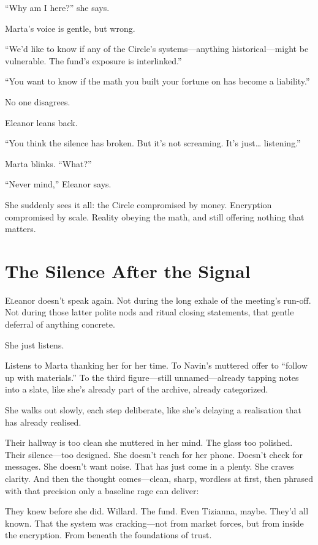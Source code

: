 “Why am I here?” she says.

Marta’s voice is gentle, but wrong.

“We’d like to know if any of the Circle’s systems—anything historical—might be vulnerable. The fund’s exposure is interlinked.”

“You want to know if the math you built your fortune on has become a liability.”

No one disagrees.

Eleanor leans back.

“You think the silence has broken. But it’s not screaming. It’s just… listening.”

Marta blinks. “What?”

“Never mind,” Eleanor says.

She suddenly sees it all: the Circle compromised by money. Encryption compromised by scale. Reality obeying the math, and still offering nothing that matters.

\section*{The Silence After the Signal}
\lettrine{E}leanor doesn’t speak again. Not during the long exhale of the meeting's run-off. Not during those latter polite nods and ritual closing statements, that gentle deferral of anything concrete.

She just listens.

Listens to Marta thanking her for her time. To Navin’s muttered offer to “follow up with materials.” To the third figure—still unnamed—already tapping notes into a slate, like she’s already part of the archive, already categorized.

\small
She walks out slowly, each step deliberate, like she’s delaying a realisation that has already realised.

Their hallway is too clean she muttered in her mind. The glass too polished. Their silence—too designed. She doesn’t reach for her phone. Doesn’t check for messages. She doesn’t want noise. That has just come in a plenty. She craves clarity. And then the thought comes—clean, sharp, wordless at first, then phrased with that precision only  a baseline rage can deliver:

They knew before she did. Willard. The fund. Even Tizianna, maybe. They’d all known. That the system was cracking—not from market forces, but from inside the encryption. From beneath the foundations of trust.

